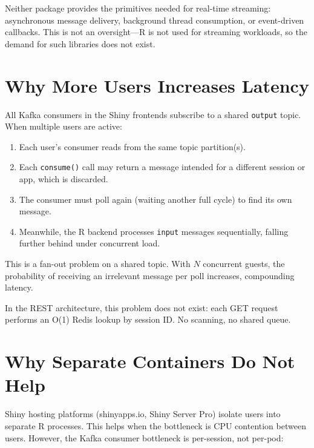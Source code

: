 \documentclass[11pt,a4paper]{article}
\begin{document}
Neither package provides the primitives needed for real-time streaming:
asynchronous message delivery, background thread consumption, or
event-driven callbacks. This is not an oversight---R is not used for
streaming workloads, so the demand for such libraries does not exist.

\section{Why More Users Increases Latency}

All Kafka consumers in the Shiny frontends subscribe to a shared
\texttt{output} topic. When multiple users are active:

\begin{enumerate}
  \item Each user's consumer reads from the same topic partition(s).
  \item Each \texttt{consume()} call may return a message intended for a
        different session or app, which is discarded.
  \item The consumer must poll again (waiting another full cycle) to find
        its own message.
  \item Meanwhile, the R backend processes \texttt{input} messages
        sequentially, falling further behind under concurrent load.
\end{enumerate}

This is a fan-out problem on a shared topic. With $N$ concurrent guests,
the probability of receiving an irrelevant message per poll increases,
compounding latency.

In the REST architecture, this problem does not exist: each GET request
performs an O(1) Redis lookup by session ID. No scanning, no shared queue.

\section{Why Separate Containers Do Not Help}

Shiny hosting platforms (shinyapps.io, Shiny Server Pro) isolate users
into separate R processes. This helps when the bottleneck is CPU contention
between users. However, the Kafka consumer bottleneck is per-session,
not per-pod:
\end{document}
